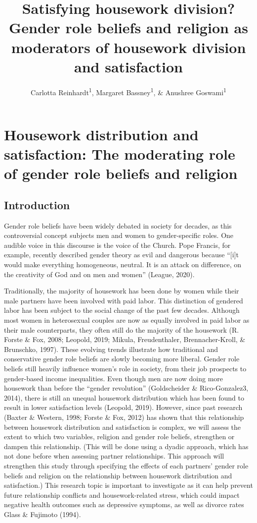 \documentclass[
  man,floatsintext]{apa6}
\title{Satisfying housework division? Gender role beliefs and religion as moderators of housework division and satisfaction}
\author{Carlotta Reinhardt\textsuperscript{1}, Margaret Bassney\textsuperscript{1}, \& Anushree Goswami\textsuperscript{1}}
\date{}
\affiliation{\vspace{0.5cm}\textsuperscript{1} Smith College}
\begin{document}
\maketitle

\hypertarget{housework-distribution-and-satisfaction-the-moderating-role-of-gender-role-beliefs-and-religion}{%
\section{Housework distribution and satisfaction: The moderating role of gender role beliefs and religion}\label{housework-distribution-and-satisfaction-the-moderating-role-of-gender-role-beliefs-and-religion}}

\hypertarget{introduction}{%
\subsection{Introduction}\label{introduction}}

Gender role beliefs have been widely debated in society for decades, as this controversial concept subjects men and women to gender-specific roles. One audible voice in this discourse is the voice of the Church. Pope Francis, for example, recently described gender theory as evil and dangerous because ``{[}i{]}t would make everything homogeneous, neutral. It is an attack on difference, on the creativity of God and on men and women'' (League, 2020).

Traditionally, the majority of housework has been done by women while their male partners have been involved with paid labor. This distinction of gendered labor has been subject to the social change of the past few decades. Although most women in heterosexual couples are now as equally involved in paid labor as their male counterparts, they often still do the majority of the housework (R. Forste \& Fox, 2008; Leopold, 2019; Mikula, Freudenthaler, Brennacher-Kroll, \& Brunschko, 1997). These evolving trends illustrate how traditional and conservative gender role beliefs are slowly becoming more liberal. Gender role beliefs still heavily influence women's role in society, from their job prospects to gender-based income inequalities. Even though men are now doing more housework than before the ``gender revolution'' (Goldscheider \& Rico-Gonzalez3, 2014), there is still an unequal housework distribution which has been found to result in lower satisfaction levels (Leopold, 2019). However, since past research (Baxter \& Western, 1998; Forste \& Fox, 2012) has shown that this relationship between housework distribution and satisfaction is complex, we will assess the extent to which two variables, religion and gender role beliefs, strengthen or dampen this relationship.
(This will be done using a dyadic approach, which has not done before when assessing partner relationships. This approach will strengthen this study through specifying the effects of each partners' gender role beliefs and religion on the relationship between housework distribution and satisfaction.)
This research topic is important to investigate as it can help prevent future relationship conflicts and housework-related stress, which could impact negative health outcomes such as depressive symptoms, as well as divorce rates Glass \& Fujimoto (1994).
\end{document}
